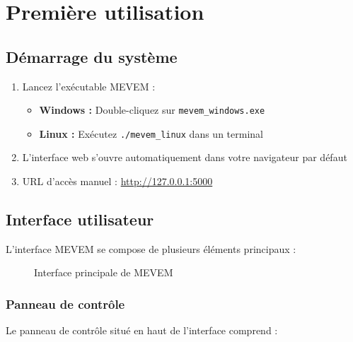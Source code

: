 \documentclass[12pt,a4paper]{article}
\begin{document}
\section{Première utilisation}

\subsection{Démarrage du système}

\begin{enumerate}
    \item Lancez l'exécutable MEVEM :
    \begin{itemize}
        \item \textbf{Windows :} Double-cliquez sur \texttt{mevem\_windows.exe}
        \item \textbf{Linux :} Exécutez \texttt{./mevem\_linux} dans un terminal
    \end{itemize}
    
    \item L'interface web s'ouvre automatiquement dans votre navigateur par défaut
    \item URL d'accès manuel : \url{http://127.0.0.1:5000}
\end{enumerate}

\subsection{Interface utilisateur}

L'interface MEVEM se compose de plusieurs éléments principaux :

\begin{figure}[H]
    \centering
    \caption{Interface principale de MEVEM}
    \label{fig:interface_principale}
\end{figure}

\subsubsection{Panneau de contrôle}

Le panneau de contrôle situé en haut de l'interface comprend :
\end{document}
